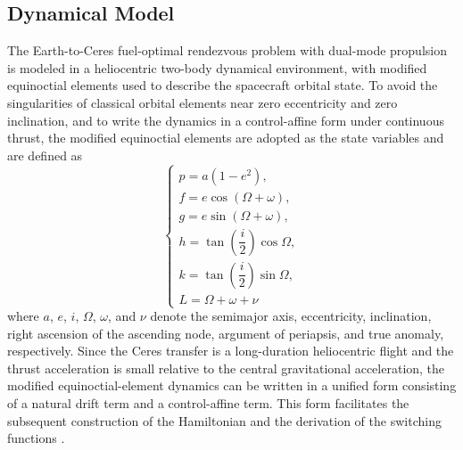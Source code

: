 ﻿\documentclass{IEEEtaes}
\begin{document}
\subsection{Dynamical Model}
The Earth-to-Ceres fuel-optimal rendezvous problem with dual-mode propulsion is modeled in a heliocentric two-body dynamical environment, with modified equinoctial elements used to describe the spacecraft orbital state. To avoid the singularities of classical orbital elements near zero eccentricity and zero inclination, and to write the dynamics in a control-affine form under continuous thrust, the modified equinoctial elements are adopted as the state variables and are defined as
\begin{equation}
\begin{cases}
p=a(1-e^2),\\
f=e\cos(\mathit{\Omega}+\omega),\\
g=e\sin(\mathit{\Omega}+\omega),\\
h=\tan\left(\dfrac{i}{2}\right)\cos\mathit{\Omega},\\
k=\tan\left(\dfrac{i}{2}\right)\sin\mathit{\Omega},\\
L=\mathit{\Omega}+\omega+\nu
\end{cases}
\end{equation}
where $a$, $e$, $i$, $\mathit{\Omega}$, $\omega$, and $\nu$ denote the semimajor axis, eccentricity, inclination, right ascension of the ascending node, argument of periapsis, and true anomaly, respectively. Since the Ceres transfer is a long-duration heliocentric flight and the thrust acceleration is small relative to the central gravitational acceleration, the modified equinoctial-element dynamics can be written in a unified form consisting of a natural drift term and a control-affine term. This form facilitates the subsequent construction of the Hamiltonian and the derivation of the switching functions \cite{jiang2012,chi2022}.
\end{document}
